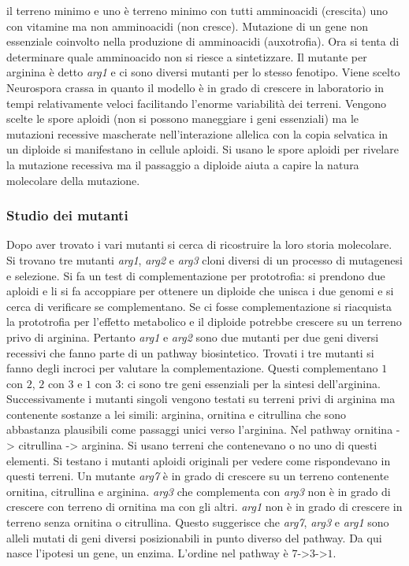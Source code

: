 il terreno minimo  e uno \`e terreno minimo con tutti amminoacidi (crescita) uno con vitamine ma non amminoacidi (non cresce). Mutazione di un gene non essenziale coinvolto nella
produzione di amminoacidi (auxotrofia). Ora si tenta di determinare quale amminoacido non si riesce a sintetizzare. Il mutante per arginina \`e detto \emph{arg1} e ci sono diversi 
mutanti per lo stesso fenotipo. Viene scelto Neurospora crassa in quanto il modello \`e in grado di crescere in laboratorio in tempi relativamente veloci facilitando l'enorme
variabilit\`a dei terreni. Vengono scelte le spore aploidi (non si possono maneggiare i geni essenziali) ma le mutazioni recessive mascherate nell'interazione allelica con la copia
selvatica in un diploide si manifestano in cellule aploidi. Si usano le spore aploidi per rivelare la mutazione recessiva ma il passaggio a diploide aiuta a capire la natura 
molecolare della mutazione.
\subsubsection{Studio dei mutanti}
Dopo aver trovato i vari mutanti si cerca di ricostruire la loro storia molecolare. Si trovano tre mutanti \emph{arg1}, \emph{arg2} e \emph{arg3} cloni diversi di un processo di 
mutagenesi e selezione. Si fa un test di complementazione per prototrofia: si prendono due aploidi e li si fa accoppiare per ottenere un diploide che unisca i due genomi e si 
cerca di verificare se complementano. Se ci fosse complementazione si riacquista la prototrofia per l'effetto metabolico e il diploide potrebbe crescere su un terreno privo di 
arginina. Pertanto \emph{arg1} e \emph{arg2} sono due mutanti per due geni diversi recessivi che fanno parte di un pathway biosintetico. Trovati i tre mutanti si fanno degli incroci
per valutare la complementazione. Questi complementano $1$ con $2$, $2$ con $3$ e $1$ con $3$: ci sono tre geni essenziali per la sintesi dell'arginina. Successivamente i mutanti 
singoli vengono testati su terreni privi di arginina ma contenente sostanze a lei simili: arginina, ornitina e citrullina che sono abbastanza plausibili come passaggi unici verso 
l'arginina. Nel pathway ornitina -> citrullina -> arginina. Si usano terreni che contenevano o no uno di questi elementi. Si testano i mutanti aploidi originali per vedere come
rispondevano in questi terreni. Un mutante \emph{arg7} \`e in grado di crescere su un terreno contenente ornitina, citrullina e arginina. \emph{arg3} che complementa con \emph{arg3}
non \`e in grado di crescere con terreno di ornitina ma con gli altri. \emph{arg1} non \`e in grado di crescere in terreno senza ornitina o citrullina. Questo suggerisce che
\emph{arg7}, \emph{arg3} e \emph{arg1} sono alleli mutati di geni diversi posizionabili in punto diverso del pathway. Da qui nasce l'ipotesi un gene, un enzima. L'ordine nel 
pathway \`e $7$->$3$->$1$.
